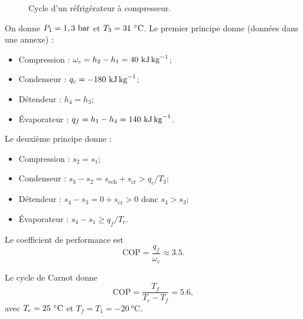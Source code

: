 \begin{figure}
            \caption{Cycle d'un réfrigérateur à compresseur.}    
            \label{fig:cycle_refrigerateur_a_compresseur}
        \end{figure}
        
        On donne $P_1=1,3~\si[]{\bar}$ et $T_3=31~\si[]{\celsius}$. Le premier principe donne (données dans une annexe) :
        \begin{itemize}
            \item Compression : $\omega_c=h_2-h_1=40~\si[]{\kilo\joule\per\kilogram}$;
            \item Condenseur : $q_c=-180~\si[]{\kilo\joule\per\kilogram}$;
            \item Détendeur : $h_4=h_3$;
            \item Évaporateur : $q_f=h_1-h_4=140~\si[]{\kilo\joule\per\kilogram}$.
        \end{itemize}

        Le deuxième principe donne :
        \begin{itemize}
            \item Compression : $s_2=s_1$;
            \item Condenseur : $s_3-s_2=s_{\text{ech}}+s_{\text{cr}}>q_c/T_3$;
            \item Détendeur : $s_4-s_3=0+s_{\text{cr}}>0$ donc $s_4>s_3$;
            \item Évaporateur : $s_4-s_1\geqslant q_f/T_c$.
        \end{itemize}

        Le coefficient de performance est 
        \begin{equation}
            \text{COP}=\frac{q_f}{\omega_c}\approx3.5.
        \end{equation}

        Le cycle de Carnot donne 
        \begin{equation}
            \text{COP}=\frac{T_f}{T_c-T_f}=5.6,
        \end{equation}
        avec $T_c=25~\si[]{\celsius}$ et $T_f=T_1=-20~\si{\celsius}$.